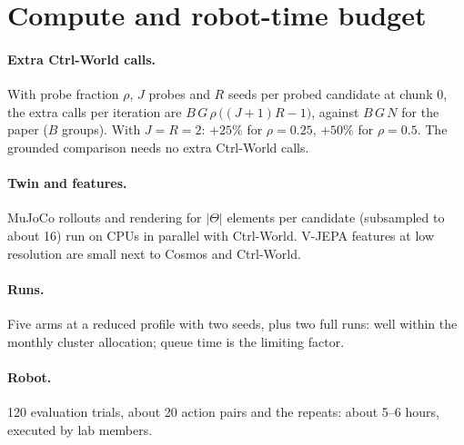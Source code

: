 \section{Compute and robot-time budget}\label{method:sec:budget}
\paragraph{Extra Ctrl-World calls.} With probe fraction $\rho$, $J$ probes and $R$ seeds per probed candidate at chunk 0, the extra calls per iteration are $B\,G\,\rho\,\big((J+1)R-1\big)$, against $B\,G\,N$ for the paper ($B$ groups). With $J=R=2$: $+25\%$ for $\rho=0.25$, $+50\%$ for $\rho=0.5$. The grounded comparison needs no extra Ctrl-World calls.
\paragraph{Twin and features.} MuJoCo rollouts and rendering for $|\Theta|$ elements per candidate (subsampled to about 16) run on CPUs in parallel with Ctrl-World. V-JEPA features at low resolution are small next to Cosmos and Ctrl-World.
\paragraph{Runs.} Five arms at a reduced profile with two seeds, plus two full runs: well within the monthly cluster allocation; queue time is the limiting factor.
\paragraph{Robot.} 120 evaluation trials, about 20 action pairs and the repeats: about 5--6 hours, executed by lab members.

